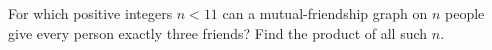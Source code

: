 For which positive integers $n<11$ can a mutual-friendship graph on $n$ people give every person exactly three friends? Find the product of all such $n$.
